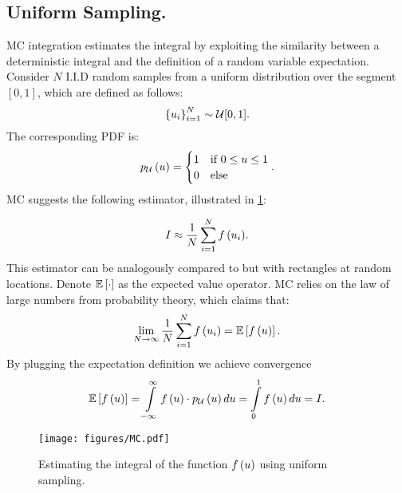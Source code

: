 \documentclass{article}
\begin{document}
\subsection{Uniform Sampling.}
\ac{MC} integration estimates the integral by exploiting the similarity between a deterministic integral and the definition of a random variable expectation. Consider $N$ \ac{I.I.D} random samples from a uniform distribution over the segment $[0,1]$, which are defined as follows:
\begin{equation}
\left\{ {u_i}\right\}_{i=1}^N \sim \mathcal{U}[0,1].
\end{equation}
The corresponding \ac{PDF} is:
   \begin{equation}
  p_{\mathcal{U}}\left({u}\right)=
  \begin{cases}
   1 & \text{if } 0 \leq u \leq1 \\
   0 & \text{else}
  \end{cases}.
  \end{equation}
  \ac{MC} suggests \citep{veach1997robust} the following estimator, illustrated in \fig\ref{fig:MC}: 

\begin{equation}
\label{eq:MC_1d_estimator}
I \approx \frac{1}{N}\sum_{i=1}^N{f\left({u_i}\right)}.
\end{equation}
 This estimator can be analogously compared to \eq{\ref{eq:one_d_sum}} but with rectangles at random locations. Denote $\mathbb{E}\left[{\cdot}\right]$ as the expected value operator. \ac{MC} relies on the law of large numbers from probability theory, which claims that:
 \begin{equation}
 \label{eq:mc_lim}
    \lim_{N\rightarrow\infty}\frac{1}{N}\sum_{i=1}^N{f\left({u_i}\right)} = \mathbb{E}\left[{f\left({u}\right)}\right].
 \end{equation}
By plugging the expectation definition we achieve convergence
  \begin{equation}
     \mathbb{E}\squarepar{f\regpar{\mcpar}}=\intop_{-\infty}^{\infty}{f\regpar{\mcpar}\cdot \unipdf\regpar{\mcpar}d\mcpar} = \intop_0^1{f\regpar{\mcpar}d\mcpar} = I .
 \end{equation}
 
\begin{figure}[t]
  \centering
  \texttt{[image: figures/MC.pdf]}
    \caption{Estimating the integral of the function $f\left({u}\right)$ using uniform sampling.}
    \label{fig:MC}
\end{figure}
\end{document}
